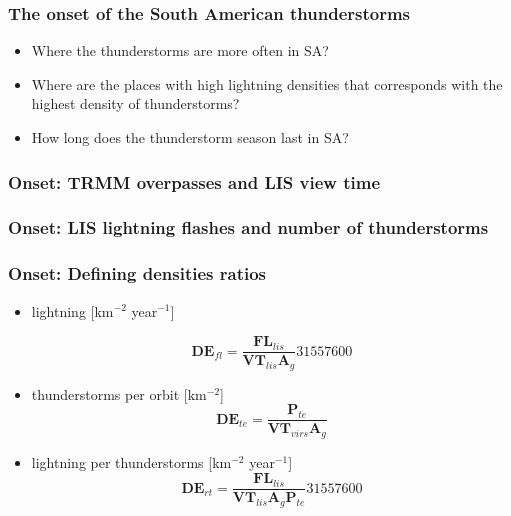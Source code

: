 \documentclass[smaller]{beamer}
\begin{document}
\begin{frame}
\frametitle{The onset of the South American thunderstorms}

\begin{itemize}
\item Where the thunderstorms are more often in SA?
\item Where are the places with high lightning densities that corresponds with the highest density of thunderstorms?
\item How long does the thunderstorm season last in SA?
\end{itemize}

\end{frame}

\begin{frame}
\frametitle{Onset: TRMM overpasses and LIS view time}

\end{frame}

\begin{frame}
\frametitle{Onset: LIS lightning flashes and number of thunderstorms}

\end{frame}


\begin{frame}
\frametitle{Onset: Defining densities ratios}
\Large
\begin{itemize}
\item lightning [km$^{-2}$ year$^{-1}$]

\begin{equation}
\mathbf{DE}_{fl} = \frac{\mathbf{FL}_{lis}}{\mathbf{VT}_{lis} \mathbf{A}_g} 31557600     
\label{defl}
\end{equation}

\item thunderstorms per orbit [km$^{-2}$]
\begin{equation}
\mathbf{DE}_{te} = \frac{\mathbf{P}_{te}}{\mathbf{VT}_{virs} \mathbf{A}_g}    
\label{dete}
\end{equation}

\item lightning per thunderstorms [km$^{-2}$ year$^{-1}$]
\begin{equation}
\mathbf{DE}_{rt} = \frac{\mathbf{FL}_{lis}}{\mathbf{VT}_{lis} \mathbf{A}_g\mathbf{P}_{te}} 31557600 
\label{dert}
\end{equation}
\end{itemize}

\end{frame}
\end{document}
